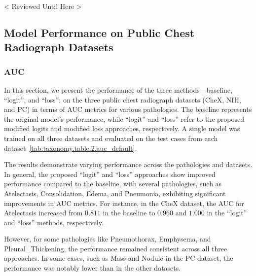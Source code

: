 < Reviewed Until Here >

\subsection{Model Performance on Public Chest Radiograph Datasets}

\subsubsection*{AUC}
In this section, we present the performance of the three methods—baseline, ``logit'', and ``loss''; on the three public chest radiograph datasets (CheX, NIH, and PC) in terms of AUC metrics for various pathologies. The baseline represents the original model's performance, while ``logit'' and ``loss'' refer to the proposed modified logits and modified loss approaches, respectively. A single model was trained on all three datasets and evaluated on the test cases from each dataset~\ref{tab:taxonomy.table.2.auc_default}.

The results demonstrate varying performance across the pathologies and datasets. In general, the proposed ``logit'' and ``loss'' approaches show improved performance compared to the baseline, with several pathologies, such as Atelectasis, Consolidation, Edema, and Pneumonia, exhibiting significant improvements in AUC metrics. For instance, in the CheX dataset, the AUC for Atelectasis increased from $0.811$ in the baseline to $0.960$ and $1.000$ in the ``logit'' and ``loss'' methods, respectively.

However, for some pathologies like Pneumothorax, Emphysema, and Pleural\_Thickening, the performance remained consistent across all three approaches. In some cases, such as Mass and Nodule in the PC dataset, the performance was notably lower than in the other datasets.


